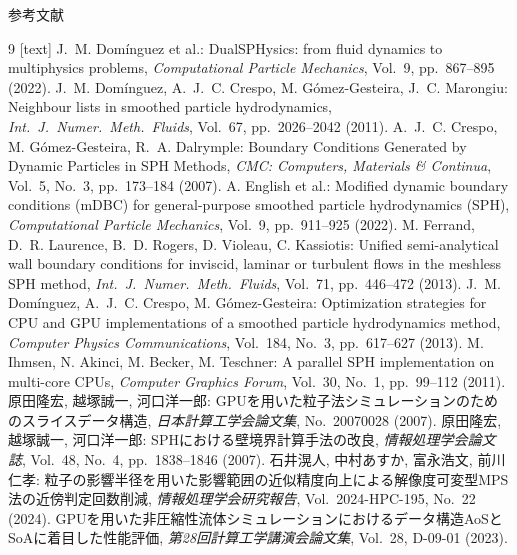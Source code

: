 \documentclass[aspectratio=169,11pt]{beamer}
\begin{document}
\begin{frame}[allowframebreaks]{参考文献}
  \small
  \begin{thebibliography}{9}
    [text]
      J.~M. Domínguez et al.:
      DualSPHysics: from fluid dynamics to multiphysics problems,
      \textit{Computational Particle Mechanics}, Vol.~9, pp.~867--895 (2022).
      J.~M. Domínguez, A.~J.~C. Crespo, M. Gómez-Gesteira, J.~C. Marongiu:
      Neighbour lists in smoothed particle hydrodynamics,
      \textit{Int.\ J.\ Numer.\ Meth.\ Fluids}, Vol.~67, pp.~2026--2042 (2011).
      A.~J.~C. Crespo, M. Gómez-Gesteira, R.~A. Dalrymple:
      Boundary Conditions Generated by Dynamic Particles in SPH Methods,
      \textit{CMC: Computers, Materials \& Continua}, Vol.~5, No.~3, pp.~173--184 (2007).
      A. English et al.:
      Modified dynamic boundary conditions (mDBC) for general-purpose smoothed particle hydrodynamics (SPH),
      \textit{Computational Particle Mechanics}, Vol.~9, pp.~911--925 (2022).
      M. Ferrand, D.~R. Laurence, B.~D. Rogers, D. Violeau, C. Kassiotis:
      Unified semi-analytical wall boundary conditions for inviscid, laminar or turbulent flows in the meshless SPH method,
      \textit{Int.\ J.\ Numer.\ Meth.\ Fluids}, Vol.~71, pp.~446--472 (2013).
      J.~M. Domínguez, A.~J.~C. Crespo, M. Gómez-Gesteira:
      Optimization strategies for CPU and GPU implementations of a smoothed particle hydrodynamics method,
      \textit{Computer Physics Communications}, Vol.~184, No.~3, pp.~617--627 (2013).
      M. Ihmsen, N. Akinci, M. Becker, M. Teschner:
      A parallel SPH implementation on multi-core CPUs,
      \textit{Computer Graphics Forum}, Vol.~30, No.~1, pp.~99--112 (2011).
      原田隆宏, 越塚誠一, 河口洋一郎:
      GPUを用いた粒子法シミュレーションのためのスライスデータ構造,
      \textit{日本計算工学会論文集}, No.~20070028 (2007).
      原田隆宏, 越塚誠一, 河口洋一郎:
      SPHにおける壁境界計算手法の改良,
      \textit{情報処理学会論文誌}, Vol.~48, No.~4, pp.~1838--1846 (2007).
      石井滉人, 中村あすか, 富永浩文, 前川仁孝:
      粒子の影響半径を用いた影響範囲の近似精度向上による解像度可変型MPS法の近傍判定回数削減,
      \textit{情報処理学会研究報告}, Vol.~2024-HPC-195, No.~22 (2024).
      GPUを用いた非圧縮性流体シミュレーションにおけるデータ構造AoSとSoAに着目した性能評価,
      \textit{第28回計算工学講演会論文集}, Vol.~28, D-09-01 (2023).
  \end{thebibliography}
\end{frame}
\end{document}
